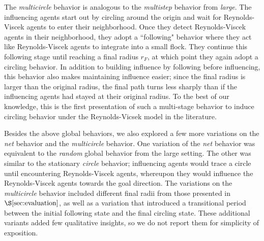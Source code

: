 The \textit{multicircle} behavior is analogous to the \textit{multistep} behavior
from \textit{large}.
The influencing agents start out by circling around the origin and wait for
Reynolds-Viscek agents to enter their neighborhood.
Once they detect Reynolds-Viscek agents in their neighborhood, they adopt a
``following" behavior where they act like Reynolds-Viscek agents to integrate
into a small flock.
They continue this following stage until reaching a final radius $r_F$, at which
point they again adopt a circling behavior.
In addition to building influence by following before influencing, this behavior
also makes maintaining influence easier; since the final radius is larger than
the original radius, the final path turns less sharply than if the influencing
agents had stayed at their original radius.
To the best of our knowledge, this is the first presentation of such a
multi-stage behavior to induce circling behavior under the Reynolds-Vicsek model in
the literature.

Besides the above global behaviors, we also explored a few more variations on
the \textit{net} behavior and the \textit{multicircle} behavior.
One variation of the \textit{net} behavior was equivalent to the \textit{random}
global behavior from the large setting.
The other was similar to the stationary \textit{circle} behavior; influencing
agents would trace a circle until encountering Reynolds-Viscek agents,
whereupon they would influence the Reynolds-Viscek agents towards the goal
direction.
The variations on the \textit{multicircle} behavior included different final
radii from those presented in $\S\ref{sec:evaluation}$, as well as a variation
that introduced a transitional period between the initial following state and
the final circling state.
These additional variants added few qualitative insights, so we do not report
them for simplicity of exposition.



